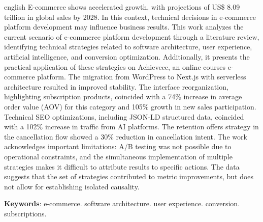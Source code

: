 \documentclass[
	12pt,				%
	twoside,			%
	a4paper,			%
	english,			%
	french,				%
	spanish,			%
	brazil				%
	]{abntex2}
\begin{document}
\begin{resumo}[Abstract]
 \begin{otherlanguage*}{english}
   E-commerce shows accelerated growth, with projections of US\$ 8.09 trillion in global sales by 2028. In this context, technical decisions in e-commerce platform development may influence business results. This work analyzes the current scenario of e-commerce platform development through a literature review, identifying technical strategies related to software architecture, user experience, artificial intelligence, and conversion optimization. Additionally, it presents the practical application of these strategies on Achievece, an online courses e-commerce platform. The migration from WordPress to Next.js with serverless architecture resulted in improved stability. The interface reorganization, highlighting subscription products, coincided with a 74\% increase in average order value (AOV) for this category and 105\% growth in new sales participation. Technical SEO optimizations, including JSON-LD structured data, coincided with a 102\% increase in traffic from AI platforms. The retention offers strategy in the cancellation flow showed a 30\% reduction in cancellation intent. The work acknowledges important limitations: A/B testing was not possible due to operational constraints, and the simultaneous implementation of multiple strategies makes it difficult to attribute results to specific actions. The data suggests that the set of strategies contributed to metric improvements, but does not allow for establishing isolated causality.

   \vspace{\onelineskip}

   \noindent
   \textbf{Keywords}: e-commerce. software architecture. user experience. conversion. subscriptions.
 \end{otherlanguage*}
\end{resumo}

\listoffigures*
\clearpage

\listoftables*
\clearpage
\end{document}
